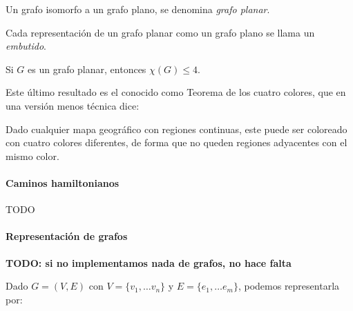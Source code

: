 \begin{definition}
	Un grafo isomorfo a un grafo plano, se denomina \textit{grafo planar}.
	
	Cada representación de un grafo planar como un grafo plano se llama un \textit{embutido}.
\end{definition}

\begin{theorem}
	Si $G$ es un grafo planar, entonces $\chi(G) \leq 4$.
\end{theorem}

Este último resultado es el conocido como Teorema de los cuatro colores, que en una versión menos técnica dice:

\begin{theorem}
	Dado cualquier mapa geográfico con regiones continuas, este puede ser coloreado con cuatro colores diferentes, de forma que no queden regiones adyacentes con el mismo color.
\end{theorem}


\hfil




\paragraph{Caminos hamiltonianos}
\hfil


TODO



\paragraph{Representación de grafos}
\hfil

\textbf{TODO: si no implementamos nada de grafos, no hace falta}

\hfil

Dado $G=(V,E)$ con $V=\{v_1,\dots v_n\}$ y $E=\{e_1,\dots e_m\}$, podemos representarla por:

